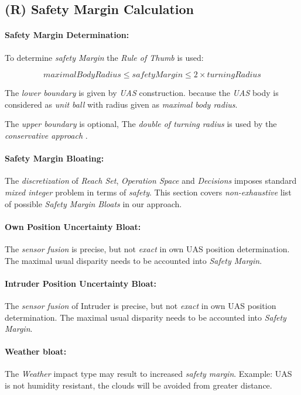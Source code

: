 \subsection{(R) Safety Margin Calculation}\label{s:safetyMarginCalculation}
\paragraph{Safety Margin Determination:} To determine \emph{safety Margin} the \emph{Rule of Thumb} is used:

\begin{equation}
    maximal Body Radius \le safety Margin \le 2 \times turning Radius
\end{equation}

\noindent The \emph{lower boundary} is given by \emph{UAS} construction. because the \emph{UAS} body is considered as \emph{unit ball} with radius given as \emph{maximal body radius}. 

The \emph{upper boundary} is optional, The \emph{double of \emph{turning radius}} is used by the \emph{conservative approach} \cite{borenstein1991vector}.


\paragraph{Safety Margin Bloating:}  The \emph{discretization} of \emph{Reach Set}, \emph{Operation Space} and \emph{Decisions} imposes standard \emph{mixed integer} problem in terms of \emph{safety}. This section covers \emph{non-exhaustive} list of possible \emph{Safety Margin Bloats} in our approach.

\paragraph{Own Position Uncertainty Bloat:} The \emph{sensor fusion} is precise, but not \emph{exact} in own UAS position determination. The maximal usual disparity needs to be accounted into \emph{Safety Margin}.

\paragraph{Intruder Position Uncertainty Bloat:} The \emph{sensor fusion} of Intruder is precise, but not \emph{exact} in own UAS position determination. The maximal usual disparity needs to be accounted into \emph{Safety Margin}.

\paragraph{Weather bloat:} The \emph{Weather} impact type may result to increased \emph{safety margin}. Example: UAS is not humidity resistant, the clouds will be avoided from greater distance.

